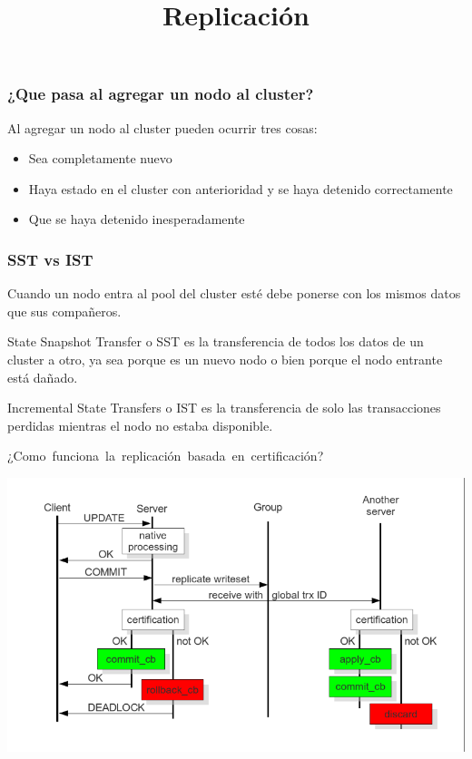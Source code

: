 \documentclass[UTF8]{beamer}
\begin{document}
\begin{frame}
	\frametitle{¿Que pasa al agregar un nodo al cluster?}
	Al agregar un nodo al cluster pueden ocurrir tres cosas:
	\begin{itemize}
		\item Sea completamente nuevo
		\pause
		\item Haya estado en el cluster con anterioridad y se haya detenido correctamente
		\pause
		\item Que se haya detenido inesperadamente
	\end{itemize}
\end{frame}

\begin{frame}
	\frametitle{SST vs IST}
	Cuando un nodo entra al pool del cluster esté debe ponerse con los mismos datos que sus compañeros.
	\pause
	\begin{framed}
		State Snapshot Transfer o SST es la transferencia de todos los datos de un cluster a otro, ya sea porque es un nuevo nodo o bien porque el nodo entrante está dañado.
	\end{framed}
	\pause
	\begin{framed}
		Incremental State Transfers o IST es la transferencia de solo las transacciones perdidas mientras el nodo no estaba disponible.
	\end{framed}
\end{frame}


\title[Replicación]{Replicación}
\begin{frame}
	\centering
	\mbox{¿Como funciona la replicación basada en certificación?}	
\end{frame}


\begin{frame}
	\includegraphics[width=\textwidth,height=\textheight,keepaspectratio]{images/certificationbasedreplication.png}
\end{frame}
\end{document}
